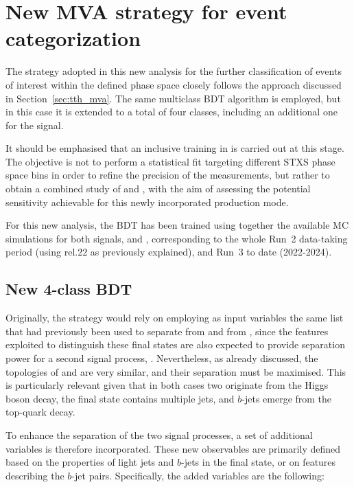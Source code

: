 \section{New MVA strategy for event categorization}

The strategy adopted in this new analysis for the further classification of events of interest within the defined phase space closely follows the approach discussed in Section~\ref{sec:tth_mva}. The same multiclass BDT algorithm is employed, but in this case it is extended to a total of four classes, including an additional one for the \thtt signal.

It should be emphasised that an inclusive training in \pth is carried out at this stage. The objective is not to perform a statistical fit targeting different STXS phase space bins in order to refine the precision of the measurements, but rather to obtain a combined study of \ttH and \thqb, with the aim of assessing the potential sensitivity achievable for this newly incorporated production mode.

For this new analysis, the BDT has been trained using together the available MC simulations for both signals, \ztautau and \ttbar, corresponding to the whole Run~2 data-taking period (using rel.22 as previously explained), and Run~3 to date (2022-2024).

\subsection{New 4-class BDT}
Originally, the strategy would rely on employing as input variables the same list that had previously been used to separate \ttH from \ztautau and from \ttbar, since the features exploited to distinguish these final states are also expected to provide separation power for a second signal process, \thqb.
Nevertheless, as already discussed, the topologies of \ttHtt and \thtt are very similar, and their separation must be maximised. This is particularly relevant given that in both cases two \tauhad originate from the Higgs boson decay, the final state contains multiple jets, and $b$-jets emerge from the top-quark decay.

To enhance the separation of the two signal processes, a set of additional variables is therefore incorporated. These new observables are primarily defined based on the properties of light jets and $b$-jets in the final state, or on features describing the $b$-jet pairs. Specifically, the added variables are the following:

